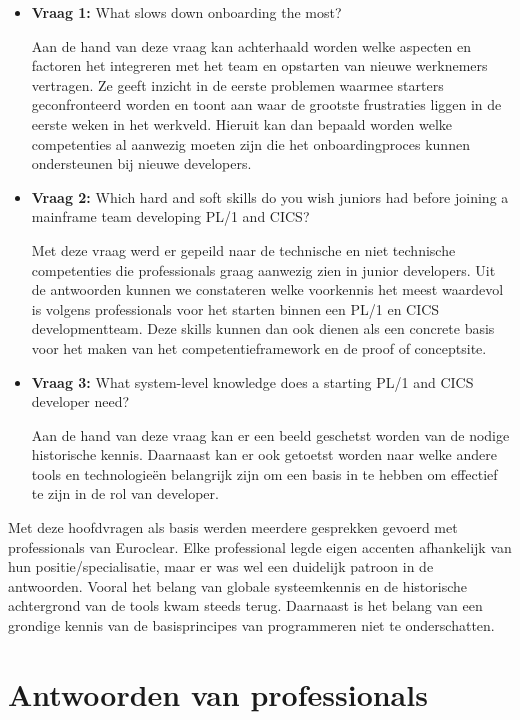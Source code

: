 \begin{itemize}
    \item \textbf{Vraag 1:} What slows down onboarding the most?
    
    Aan de hand van deze vraag kan achterhaald worden welke aspecten en factoren het integreren met 
    het team en opstarten van nieuwe werknemers vertragen. Ze geeft inzicht in de eerste problemen 
    waarmee starters geconfronteerd worden en toont aan waar de grootste frustraties liggen in de eerste
    weken in het werkveld.
    Hieruit kan dan bepaald worden welke competenties al aanwezig moeten zijn die het onboardingproces kunnen ondersteunen
    bij nieuwe developers.
    
    \item \textbf{Vraag 2:} Which hard and soft skills do you wish juniors had before joining a mainframe team developing PL/1 and CICS?
   
    Met deze vraag werd er gepeild naar de technische en niet technische competenties die professionals graag aanwezig zien in
    junior developers. Uit de antwoorden kunnen we constateren welke voorkennis het meest waardevol is volgens professionals
    voor het starten binnen een PL/1 en CICS developmentteam.
    Deze skills kunnen dan ook dienen als een concrete basis voor het maken van het competentieframework en de proof of conceptsite.

    \item \textbf{Vraag 3:} What system-level knowledge does a starting PL/1 and CICS developer need?
    
    Aan de hand van deze vraag kan er een beeld geschetst worden van de nodige historische kennis.
    Daarnaast kan er ook getoetst worden naar welke andere tools en technologieën belangrijk zijn om een basis in te hebben
    om effectief te zijn in de rol van developer.
    
\end{itemize}

Met deze hoofdvragen als basis werden meerdere gesprekken gevoerd met professionals van Euroclear.
Elke professional legde eigen accenten afhankelijk van hun positie/specialisatie, maar er was wel een duidelijk patroon in de antwoorden.
Vooral het belang van globale systeemkennis en de historische achtergrond van de tools kwam steeds terug.
Daarnaast is het belang van een grondige kennis van de basisprincipes van programmeren niet te onderschatten.


\section{Antwoorden van professionals}%
\label{sec:antwoorden-van-professionals}

